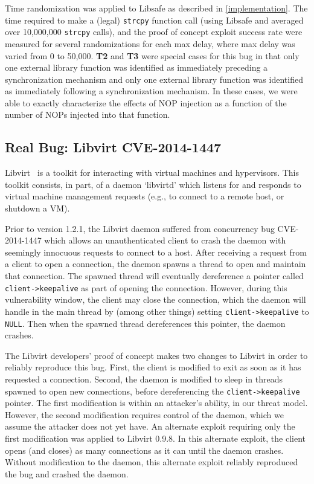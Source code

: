 Time randomization was applied to Libsafe as described in \autoref{implementation}.
The time required to make a (legal) \texttt{strcpy} function call (using Libsafe and averaged over 10,000,000 \texttt{strcpy} calls), and the proof of concept exploit success rate were measured for several randomizations for each max delay, where max delay was varied from 0 to 50,000.
\textbf{T2} and \textbf{T3} were special cases for this bug in that only one external library function was identified as immediately preceding a synchronization mechanism and only one external library function was identified as immediately following a synchronization mechanism.
In these cases, we were able to exactly characterize the effects of NOP injection as a function of the number of NOPs injected into that function.
\subsection{Real Bug: Libvirt CVE-2014-1447}
Libvirt~\cite{libvirt} is a toolkit for interacting with virtual machines and hypervisors.
This toolkit consists, in part, of a daemon `libvirtd' which listens for and
responds to virtual machine management requests (e.g., to connect to a remote host, or shutdown a VM).

Prior to version 1.2.1, the Libvirt daemon suffered from concurrency bug CVE-2014-1447 which allows an unauthenticated client to crash the daemon with seemingly innocuous requests to connect to a host.
After receiving a request from a client to open a connection, the daemon spawns a thread to open and maintain that connection.
The spawned thread will eventually dereference a pointer called
\texttt{client->keepalive} as part of opening the connection.
However, during this vulnerability window, the client may close the
connection, which the daemon will handle in the main thread by (among other
things) setting \texttt{client->keepalive} to \texttt{NULL}.
Then when the spawned thread dereferences this pointer, the daemon crashes.~\cite{RHELbug1047577}

The Libvirt developers' proof of concept makes two changes to Libvirt in order to reliably reproduce this bug.
First, the client is modified to exit as soon as it has requested a connection.
Second, the daemon is modified to sleep in threads spawned to open new
connections, before dereferencing the \texttt{client->keepalive} pointer.
The first modification is within an attacker's ability, in our threat model.
However, the second modification requires control of the daemon, which we assume the attacker does not yet have.
An alternate exploit requiring only the first modification was applied to Libvirt 0.9.8.
In this alternate exploit, the client opens (and closes) as many connections as it can until the daemon crashes.
Without modification to the daemon, this alternate exploit reliably reproduced the bug and crashed the daemon.

